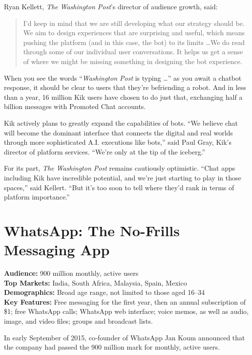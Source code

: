 \documentclass[notoc, symmetric, nobib, nols]{towcenter-guideto-book}
\begin{document}
Ryan Kellett, \textit{The Washington Post}'s director of audience growth, said: 

\begin{quote}
I'd keep in mind that we are still developing what our strategy should be. We aim to design experiences that are surprising and useful, which means pushing the platform (and in this case, the bot) to its limits \ldots We do read through some of our individual user conversations. It helps us get a sense of where we might be missing something in designing the bot experience. 
\end{quote}

When you see the words ``\textit{Washington Post} is typing \ldots '' as you await a chatbot response, it should be clear to users that they're befriending a robot. And in less than a year, 16 million Kik users have chosen to do just that, exchanging half a billion messages with Promoted Chat accounts.  

Kik actively plans to greatly expand the capabilities of bots. ``We believe chat will become the dominant interface that connects the digital and real worlds through more sophisticated A.I. executions like bots,'' said Paul Gray, Kik's director of platform services. ``We're only at the tip of the iceberg.''  

For its part, \textit{The Washington Post} remains cautiously optimistic. ``Chat apps including Kik have incredible potential, and we're just starting to play in those spaces,'' said Kellert. ``But it's too soon to tell where they'd rank in terms of platform importance.'' 

\section{WhatsApp: The No-Frills Messaging App}

\begin{framed}
\noindent\textbf{Audience:} 900 million monthly, active users \\
\noindent\textbf{Top Markets:} India, South Africa, Malaysia, Spain, Mexico \\
\noindent\textbf{Demographics:} Broad age range, not limited to those aged 16--34\\
\noindent\textbf{Key Features:} Free messaging for the first year, then an annual subscription of \$1; free WhatsApp calls; WhatsApp web interface; voice memos, as well as audio, image, and video files; groups and broadcast lists.
\end{framed}
\vspace{\baselineskip}
In early September of 2015, co-founder of WhatsApp Jan Koum announced that the company had passed the 900 million mark for monthly, active users.\autocite{FacebookWhatsApp}
\end{document}
